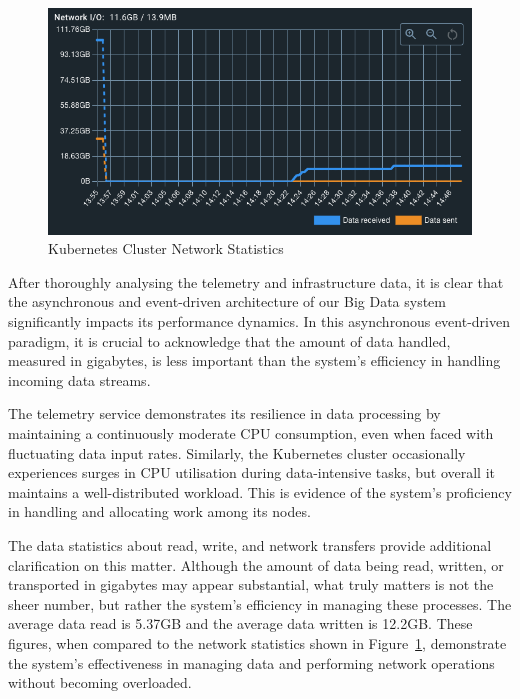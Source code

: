 \documentclass[preprint,12pt]{elsarticle}
\begin{document}
\begin{figure}[h!]
  \centering
  \includegraphics[width=\textwidth]{images/kubernetes-cluster-network-data-received-and-sent.png}
  \caption{Kubernetes Cluster Network Statistics}
  \label{kubernetesClusterNetworkStatistics}
\end{figure}

After thoroughly analysing the telemetry and infrastructure data, it is clear that the asynchronous and event-driven architecture of our Big Data system significantly impacts its performance dynamics. In this asynchronous event-driven paradigm, it is crucial to acknowledge that the amount of data handled, measured in gigabytes, is less important than the system's efficiency in handling incoming data streams.

The telemetry service demonstrates its resilience in data processing by maintaining a continuously moderate CPU consumption, even when faced with fluctuating data input rates. Similarly, the Kubernetes cluster occasionally experiences surges in CPU utilisation during data-intensive tasks, but overall it maintains a well-distributed workload. This is evidence of the system's proficiency in handling and allocating work among its nodes.

The data statistics about read, write, and network transfers provide additional clarification on this matter. Although the amount of data being read, written, or transported in gigabytes may appear substantial, what truly matters is not the sheer number, but rather the system's efficiency in managing these processes. The average data read is 5.37GB and the average data written is 12.2GB. These figures, when compared to the network statistics shown in Figure~\ref{kubernetesClusterNetworkStatistics}, demonstrate the system's effectiveness in managing data and performing network operations without becoming overloaded.
\end{document}
